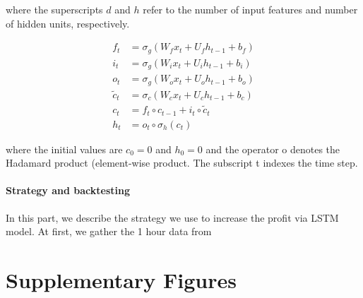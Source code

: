 \documentclass[twoside]{report}
\begin{document}
\begin{spacing}{1}
where the superscripts $d$ and $h$ refer to the number of input features and number of hidden units, respectively.

$$
\begin{aligned}
f_{t} &=\sigma_{g}\left(W_{f} x_{t}+U_{f} h_{t-1}+b_{f}\right) \\
i_{t} &=\sigma_{g}\left(W_{i} x_{t}+U_{i} h_{t-1}+b_{i}\right) \\
o_{t} &=\sigma_{g}\left(W_{o} x_{t}+U_{o} h_{t-1}+b_{o}\right) \\
\tilde{c}_{t} &=\sigma_{c}\left(W_{c} x_{t}+U_{c} h_{t-1}+b_{c}\right) \\
c_{t} &=f_{t} \circ c_{t-1}+i_{t} \circ \tilde{c}_{t} \\
h_{t} &=o_{t} \circ \sigma_{h}\left(c_{t}\right)
\end{aligned}
$$

where the initial values are  $c_{0}=0$  and $h_{0}=0$  and the operator o denotes the Hadamard product (element-wise product. The subscript  t indexes the time step. 

\subsubsection{Strategy and backtesting}
In this part, we describe the strategy we use to increase the profit via LSTM model. At first, we gather the 1 hour data from 

























\appendix
\chapter{Supplementary Figures}\label{app:supplementary figures}


\end{spacing}
\end{document}
